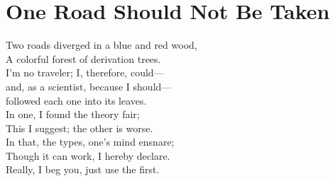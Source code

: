 
\chapter*{One Road Should Not Be Taken}
\begin{flushleft}
Two roads diverged in a blue and red wood,\\
A colorful forest of derivation trees.\\
I'm no traveler; I, therefore, could---\\
and, as a scientist, because I should---\\
followed each one into its leaves.\\[6pt]

In one, I found the theory fair;\\
This I suggest; the other is worse.\\
In that, the types, one's mind ensnare;\\
Though it can work, I hereby declare.\\
Really, I beg you, just use the first.
\end{flushleft}
